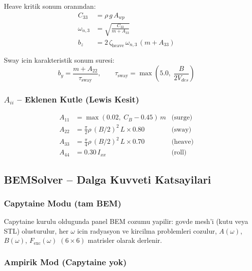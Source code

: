\documentclass[12pt,a4paper]{article}
\begin{document}
Heave kritik sonum oranından:
\begin{align}
  C_{33} &= \rho\,g\,A_{wp}
  \label{eq:c33_est} \\[4pt]
  \omega_{n,3} &= \sqrt{\frac{C_{33}}{m+A_{33}}}
  \label{eq:omegan3} \\[4pt]
  b_z &= 2\,\zeta_{\text{heave}}\,\omega_{n,3}\,(m+A_{33})
  \label{eq:bz}
\end{align}

Sway icin karakteristik sonum suresi:
\begin{equation}
  b_y = \frac{m+A_{22}}{\tau_{\text{sway}}},\qquad
  \tau_{\text{sway}} = \max\!\left(5.0,\;\frac{B}{2V_{des}}\right)
  \label{eq:by}
\end{equation}

\subsubsection{$A_{ii}$ -- Eklenen Kutle (Lewis Kesit)}

\begin{align}
  A_{11} &= \max(0.02,\;C_B-0.45)\,m
  &\text{(surge)} \\
  A_{22} &= \tfrac{\pi}{2}\rho\,(B/2)^2\,L\times 0.80
  &\text{(sway)} \\
  A_{33} &= \tfrac{\pi}{4}\rho\,(B/2)^2\,L\times 0.70
  &\text{(heave)} \\
  A_{44} &= 0.30\,I_{xx}
  &\text{(roll)}
  \label{eq:added_mass_lewis}
\end{align}

\subsection{BEMSolver -- Dalga Kuvveti Katsayilari}

\subsubsection{Capytaine Modu (tam BEM)}

Capytaine kurulu oldugunda panel BEM cozumu yapilir:
govde mesh'i (kutu veya STL) olusturulur, her $\omega$ icin radyasyon
ve kircilma problemleri cozulur, $A(\omega)$, $B(\omega)$, $F_{\text{exc}}(\omega)$
$(6\times6)$ matrisler olarak derlenir.

\subsubsection{Ampirik Mod (Capytaine yok)}
\end{document}
